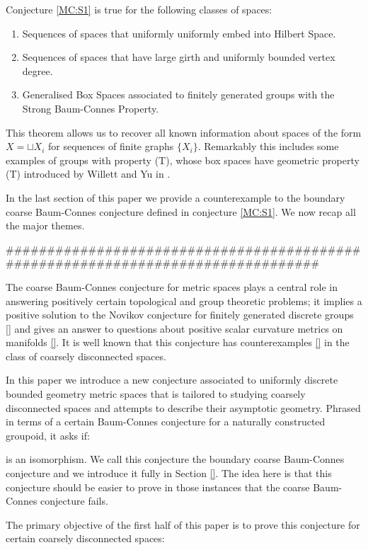 \begin{theorem}\label{MT:S1}
Conjecture \ref{MC:S1} is true for the following classes of spaces:
\begin{enumerate}
\item Sequences of spaces that uniformly uniformly embed into Hilbert Space. 
\item Sequences of spaces that have large girth and uniformly bounded vertex degree.
\item Generalised Box Spaces associated to finitely generated groups with the Strong Baum-Connes Property.
\end{enumerate}
\end{theorem}
This theorem allows us to recover all known information about spaces of the form $X = \sqcup X_{i}$ for sequences of finite graphs $\lbrace X_{i} \rbrace$. Remarkably this includes some examples of groups with property (T), whose box spaces have geometric property (T) introduced by Willett and Yu in \cite{explg2}.

In the last section of this paper we provide a counterexample to the boundary coarse Baum-Connes conjecture defined in conjecture \ref{MC:S1}. We now recap all the major themes.


#################################################################################

The coarse Baum-Connes conjecture for metric spaces plays a central role in answering positively certain topological and group theoretic problems; it implies a positive solution to the Novikov conjecture for finitely generated discrete groups \ref{} and gives an answer to questions about positive scalar curvature metrics on manifolds \ref{}. It is well known that this conjecture has counterexamples \ref{} in the class of coarsely disconnected spaces.

In this paper we introduce a new conjecture associated to uniformly discrete bounded geometry metric spaces that is tailored to studying coarsely disconnected spaces and attempts to describe their asymptotic geometry. Phrased in terms of a certain Baum-Connes conjecture for a naturally constructed groupoid, it asks if:

is an isomorphism. We call this conjecture the boundary coarse Baum-Connes conjecture and we introduce it fully in Section \ref{}. The idea here is that this conjecture should be easier to prove in those instances that the coarse Baum-Connes conjecture fails.

The primary objective of the first half of this paper is to prove this conjecture for certain coarsely disconnected spaces:

